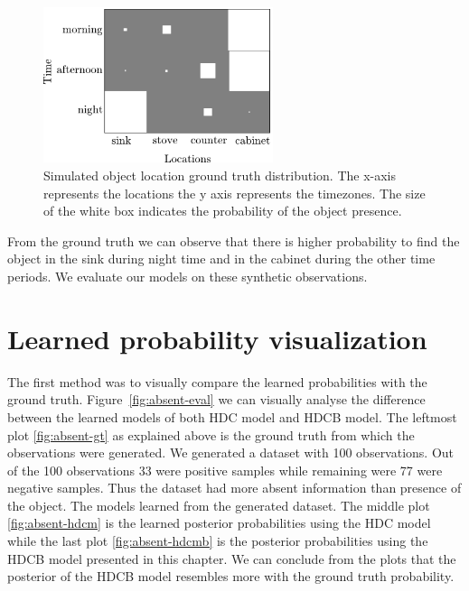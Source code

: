 \begin{figure}[htp]
\centering
\includegraphics[width=0.6\textwidth]{images/absent_groundtruth.png}
\caption[Simulated object location ground truth distribution]{Simulated object location ground truth distribution.
The x-axis represents the locations the y axis represents the timezones. The size of the white box indicates the probability of the object presence.}
\label{absent-gt}
\end{figure}

From the ground truth we can observe that there is higher probability to find the object in the sink during night time and in the cabinet during the other time periods. We evaluate our models on these synthetic observations.

\section{Learned probability visualization}
The first method was to visually compare the learned probabilities with the ground truth.  Figure~\ref{fig:absent-eval} we can visually analyse the difference between the learned models of both HDC model and HDCB model. The leftmost plot \ref{fig:absent-gt} as explained above is the ground truth from which the observations were generated. We generated a dataset with 100 observations. Out of the 100 observations 33 were positive samples while remaining were 77 were negative samples. Thus the dataset had more absent information than presence of the object. The models learned from the generated dataset. The middle plot \ref{fig:absent-hdcm} is the learned posterior probabilities using the HDC model while the last plot \ref{fig:absent-hdcmb} is the posterior probabilities using the HDCB model presented in this chapter. We can conclude from the plots that the posterior of the HDCB model resembles more with the ground truth probability. 

